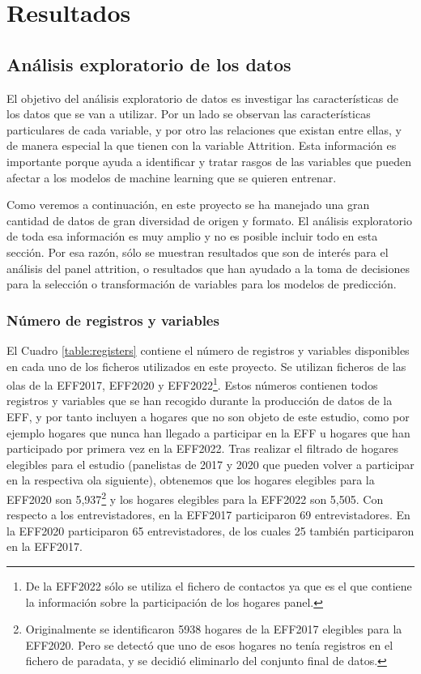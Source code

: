 \chapter{Resultados}
\label{chapter:resultados}

\section{Análisis exploratorio de los datos}

El objetivo del análisis exploratorio de datos es investigar las características de los datos que se van a utilizar. Por un lado se observan las características particulares de cada variable, y por otro las relaciones que existan entre ellas, y de manera especial la que tienen con la variable Attrition. Esta información es importante porque ayuda a identificar y tratar rasgos de las variables que pueden afectar a los modelos de machine learning que se quieren entrenar.

Como veremos a continuación, en este proyecto se ha manejado una gran cantidad de datos de gran diversidad de origen y formato. El análisis exploratorio de toda esa información es muy amplio y no es posible incluir todo en esta sección. Por esa razón, sólo se muestran resultados que son de interés para el análisis del panel attrition, o resultados que han ayudado a la toma de decisiones para la selección o transformación de variables para los modelos de predicción.

\subsection*{Número de registros y variables}

El Cuadro \ref{table:registers} contiene el número de registros y variables disponibles en cada uno de los ficheros utilizados en este proyecto. Se utilizan ficheros de las olas de la EFF2017, EFF2020 y EFF2022\footnote{De la EFF2022 sólo se utiliza el fichero de contactos ya que es el que contiene la información sobre la participación de los hogares panel.}. Estos números contienen todos registros y variables que se han recogido durante la producción de datos de la EFF, y por tanto incluyen a hogares que no son objeto de este estudio, como por ejemplo hogares que nunca han llegado a participar en la EFF u hogares que han participado por primera vez en la EFF2022. Tras realizar el filtrado de hogares elegibles para el estudio (panelistas de 2017 y 2020 que pueden volver a participar en la respectiva ola siguiente), obtenemos que los hogares elegibles para la EFF2020 son 5,937\footnote{Originalmente se identificaron 5938 hogares de la EFF2017 elegibles para la EFF2020. Pero se detectó que uno de esos hogares no tenía registros en el fichero de paradata, y se decidió eliminarlo del conjunto final de datos.} y los hogares elegibles para la EFF2022 son 5,505. Con respecto a los entrevistadores, en la EFF2017 participaron 69 entrevistadores. En la EFF2020 participaron 65 entrevistadores, de los cuales 25 también participaron en la EFF2017.

